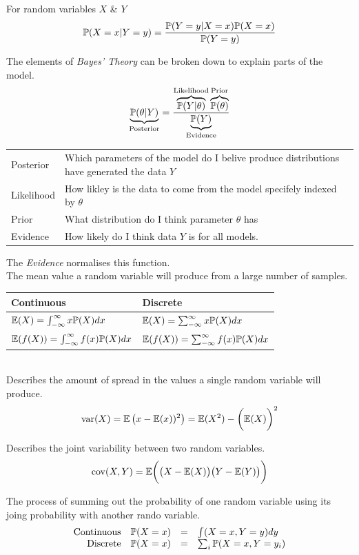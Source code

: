 \documentclass[11pt,a4paper]{article}
\begin{document}
For random variables $X$ \& $Y$
$$\mathbb{P}(X=x|Y=y)=\frac{\mathbb{P}(Y=y|X=x)\mathbb{P}(X=x)}{\mathbb{P}(Y=y)}$$

The elements of \textit{Bayes' Theory} can be broken down to explain parts of the model.
$$\underbrace{\mathbb{P}(\theta|Y)}_{\text{Posterior}}=\frac{\overbrace{\mathbb{P}(Y|\theta)}^{\text{Likelihood}}\overbrace{\mathbb{P}(\theta)}^{\text{Prior}}}{\underbrace{\mathbb{P}(Y)}_{\text{Evidence}}}$$
\begin{tabular}{l|l}
Posterior&Which parameters of the model do I belive produce distributions have generated the data $Y$\\
Likelihood&How likley is the data to come from the model specifely indexed by $\theta$\\
Prior&What distribution do I think parameter $\theta$ has\\
Evidence&How likely do I think data $Y$ is for all models.
\end{tabular}
\nb The \textit{Evidence} normalises this function.\\

The mean value a random variable will produce from a large number of samples.\\
\begin{tabular}{l|l}
Continuous&Discrete\\\hline
$\mathbb{E}(X)=\int_{-\infty}^{\infty} x\mathbb{P}(X)dx$&$\mathbb{E}(X)=\sum_{-\infty}^{\infty} x\mathbb{P}(X)dx$\\
$\mathbb{E}(f(X))=\int_{-\infty}^{\infty} f(x)\mathbb{P}(X)dx$&$\mathbb{E}(f(X))=\sum_{-\infty}^{\infty} f(x)\mathbb{P}(X)dx$
\end{tabular}\\

Describes the amount of spread in the values a single random variable will produce.
$$\mathrm{var}(X)=\mathbb{E}\left(x-\mathbb{E}(x))^2\right)=\mathbb{E}(X^2)-\bigg(\mathbb{E}(X)\bigg)^2$$

Describes the joint variability between two random variables.
$$\mathrm{cov}(X,Y)=\mathbb{E}\bigg(\big(X-\mathbb{E}(X)\big)\big(Y-\mathbb{E}(Y)\big)\bigg)$$

The process of summing out the probability of one random variable using its joing probability with another rando variable.
\[\begin{array}{rrcl}
\mathrm{Continuous}&\mathbb{P}(X=x)&=&\int(X=x,Y=y)dy\\
\mathrm{Discrete}&\mathbb{P}(X=x)&=&\sum_i\mathbb{P}(X=x,Y=y_i)
\end{array}\]
\end{document}
